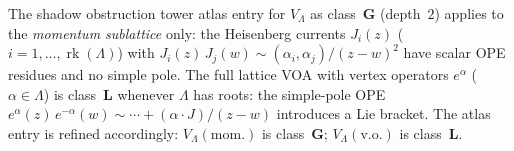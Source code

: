 \begin{remark}%
\label{rem:lattice-atlas-correction}%
%
The shadow obstruction tower atlas entry for $V_\Lambda$ as
class~$\mathbf{G}$ (depth~$2$) applies to the
\emph{momentum sublattice} only: the Heisenberg
currents $J_i(z)$ ($i = 1, \ldots, \operatorname{rk}(\Lambda)$)
with $J_i(z)\, J_j(w) \sim (\alpha_i, \alpha_j)/(z-w)^2$
have scalar OPE residues and no simple pole. The
full lattice VOA with vertex operators $e^\alpha$
($\alpha \in \Lambda$) is class~$\mathbf{L}$ whenever
$\Lambda$ has roots: the simple-pole OPE
$e^\alpha(z)\,e^{-\alpha}(w) \sim \cdots + (\alpha \cdot J)/(z-w)$
introduces a Lie bracket. The atlas entry is refined
accordingly: $V_\Lambda(\mathrm{mom.})$ is
class~$\mathbf{G}$; $V_\Lambda(\mathrm{v.o.})$ is
class~$\mathbf{L}$.
\end{remark}

